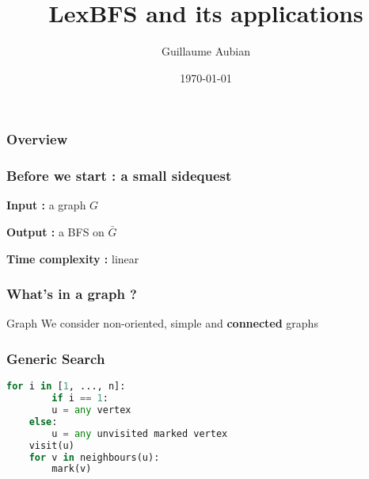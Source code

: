 \documentclass{beamer}
\begin{document}
\title{LexBFS and its applications}  
\author{Guillaume Aubian}
\date{\today} 


\begin{frame}
\titlepage
\end{frame}

\begin{frame}\frametitle{Overview}\tableofcontents
\end{frame} 


\begin{frame}\frametitle{Before we start : a small sidequest}
     \Huge
	\textbf{Input :} a graph $G$

     	\textbf{Output :} a BFS on $\bar{G}$
     
     	\textbf{Time complexity :} linear
\end{frame}

\begin{frame}\frametitle{What's in a graph ?}
    \begin{block}{Graph}
	We consider non-oriented, simple and \textbf{connected} graphs
    \end{block}

    \begin{center}
    \end{center}

\end{frame}

\begin{frame}[fragile]\frametitle{Generic Search}
    \begin{lstlisting}[language = Python]
    for i in [1, ..., n]:
        if i == 1:
	    u = any vertex
	else:
	    u = any unvisited marked vertex
	visit(u)
	for v in neighbours(u):
	    mark(v)
    \end{lstlisting}
\end{frame}
\end{document}
